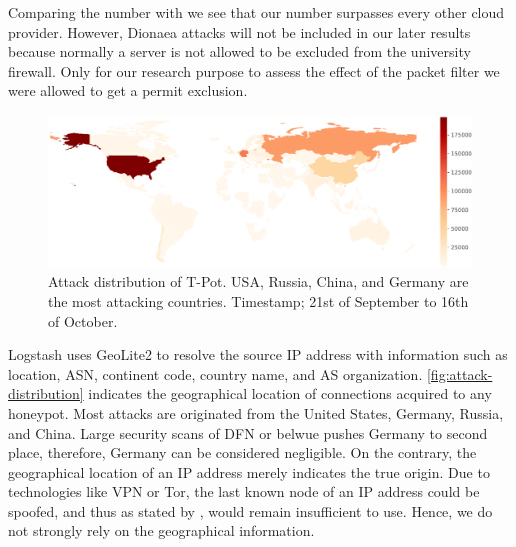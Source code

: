 Comparing the number with \citet{Kelly2021} we see that our number surpasses every other cloud provider.
However, Dionaea attacks will not be included in our later results because normally a server is not allowed to be excluded from the university firewall.
Only for our research purpose to assess the effect of the packet filter we were allowed to get a permit exclusion.

\begin{figure}[ht]
    \centering
    \includegraphics[width=\textwidth]{figures/tpot-overview-map.pdf}
    \caption[Attack distribution of T-Pot]{
        Attack distribution of T-Pot. USA, Russia, China, and Germany are the most attacking countries.
        Timestamp; 21st of September to 16th of October.
    }
    \label{fig:attack-distribution}
\end{figure}

Logstash uses GeoLite2 to resolve the source IP address with information such as location, ASN, continent code, country name, and AS organization.
\autoref{fig:attack-distribution} indicates the geographical location of connections acquired to any honeypot.
Most attacks are originated from the United States, Germany, Russia, and China.
Large security scans of DFN or \ac{belwue} pushes Germany to second place, therefore, Germany can be considered negligible.
On the contrary, the geographical location of an IP address merely indicates the true origin.
Due to technologies like VPN or Tor, the last known node of an IP address could be spoofed, and thus as stated by \citet{Kelly2021}, would remain insufficient to use.
Hence, we do not strongly rely on the geographical information.


